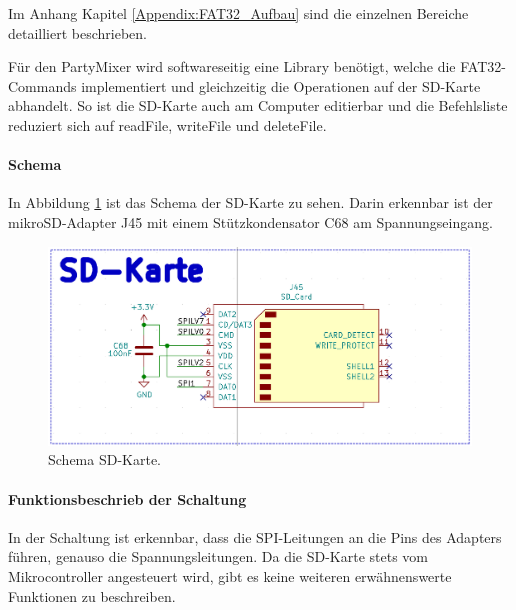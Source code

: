 Im Anhang Kapitel \ref{Appendix:FAT32_Aufbau} sind die einzelnen Bereiche detailliert beschrieben.

Für den PartyMixer wird softwareseitig eine Library benötigt, welche die FAT32-Commands  implementiert und gleichzeitig die Operationen auf der SD-Karte abhandelt. So ist die SD-Karte auch am Computer editierbar und die Befehlsliste reduziert sich auf readFile, writeFile und deleteFile.

\paragraph{Schema}\mbox{}

In Abbildung \ref{fig:Schema_SD_Karte} ist das Schema der SD-Karte zu sehen. Darin erkennbar ist der mikroSD-Adapter J45 mit einem Stützkondensator C68 am Spannungseingang.

\begin{figure}[H]
\center
\includegraphics[width = 0.6 \textwidth]{graphics/Schema_SD_Karte}
\caption{Schema SD-Karte.}
\label{fig:Schema_SD_Karte}
\end{figure}

\paragraph{Funktionsbeschrieb der Schaltung}\mbox{}

In der Schaltung ist erkennbar, dass die SPI-Leitungen an die Pins des Adapters führen, genauso die Spannungsleitungen. Da die SD-Karte stets vom Mikrocontroller angesteuert wird, gibt es keine weiteren erwähnenswerte Funktionen zu beschreiben.